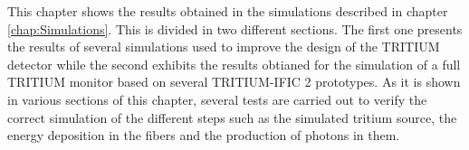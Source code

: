 This chapter shows the results obtained in the simulations described in chapter \ref{chap:Simulations}. This is divided in two different sections. The first one presents the results of several simulations used to improve the design of the TRITIUM detector while the second exhibits the results obtianed for the simulation of a full TRITIUM monitor based on several TRITIUM-IFIC 2 prototypes. As it is shown in various sections of this chapter, several tests are carried out to verify the correct simulation of the different steps such as the simulated tritium source, the energy deposition in the fibers and the production of photons in them.